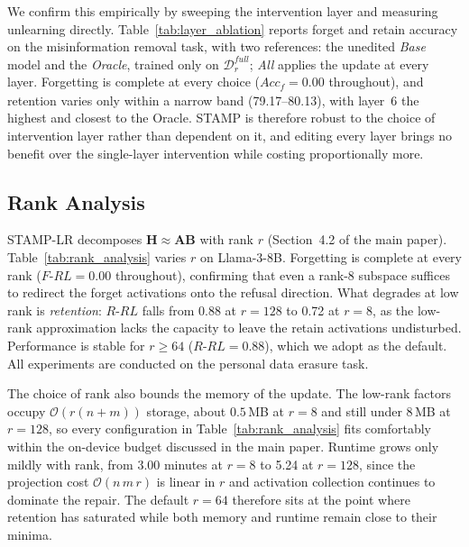 We confirm this empirically by sweeping the intervention layer and measuring unlearning directly. Table~\ref{tab:layer_ablation} reports forget and retain accuracy on the misinformation removal task, with two references: the unedited \textit{Base} model and the \textit{Oracle}, trained only on $\mathcal{D}_r^{\textit{full}}$; \textit{All} applies the update at every layer. Forgetting is complete at every choice ($Acc_\textit{f} = 0.00$ throughout), and retention varies only within a narrow band (79.17--80.13), with layer~6 the highest and closest to the Oracle. STAMP is therefore robust to the choice of intervention layer rather than dependent on it, and editing every layer brings no benefit over the single-layer intervention while costing proportionally more.

\vspace{-1cm}

\subsection{Rank Analysis}
\label{sup:rank}
STAMP-LR decomposes $\mathbf{H} \approx \mathbf{A}\mathbf{B}$ with rank $r$ (Section~4.2 of the main paper). Table~\ref{tab:rank_analysis} varies $r$ on Llama-3-8B. Forgetting is complete at every rank ($F\text{-}RL = 0.00$ throughout), confirming that even a rank-8 subspace suffices to redirect the forget activations onto the refusal direction. What degrades at low rank is \textit{retention}: $R\text{-}RL$ falls from 0.88 at $r = 128$ to 0.72 at $r = 8$, as the low-rank approximation lacks the capacity to leave the retain activations undisturbed. Performance is stable for $r \geq 64$ ($R\text{-}RL = 0.88$), which we adopt as the default. All experiments are conducted on the personal data erasure task.

The choice of rank also bounds the memory of the update. The low-rank factors occupy $\mathcal{O}(r(n + m))$ storage, about $0.5$\,MB at $r = 8$ and still under $8$\,MB at $r = 128$, so every configuration in Table~\ref{tab:rank_analysis} fits comfortably within the on-device budget discussed in the main paper. Runtime grows only mildly with rank, from 3.00 minutes at $r = 8$ to 5.24 at $r = 128$, since the projection cost $\mathcal{O}(n\,m\,r)$ is linear in $r$ and activation collection continues to dominate the repair. The default $r = 64$ therefore sits at the point where retention has saturated while both memory and runtime remain close to their minima. %

